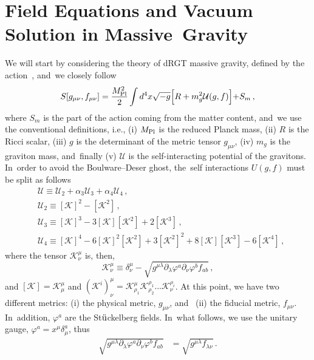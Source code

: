 \documentclass[aps,amsmath,amssymb,twocolumn]{revtex4}
\begin{document}
\section{Field Equations and Vacuum Solution in Massive~Gravity\label{sec2}}


We will start by considering the theory of dRGT massive gravity, defined by the action~\cite{deRham:2010kj,deRham:2010ik}, and~we closely follow~\cite{Panpanich:2018cxo}
%
\begin{equation}
S[g_{\mu\nu}, f_{\mu \nu}] =  \frac{M_{\rm Pl}^2}{2}   \int d^4 x \sqrt{-g} \Bigl[R + m_g^2 \mathcal{U}(g,f) \Bigl] + S_m \,,
\end{equation}
%
where $S_m$ is the part of the action coming from the matter content, and~we  use the conventional definitions, i.e.,
(i) $M_{\rm Pl}$ is the reduced Planck mass, 
(ii) $R$ is the Ricci scalar, 
(iii) $g$ is the determinant of the metric tensor $g_{\mu \nu}$,
(iv) $m_g$ is the graviton mass, and~finally 
(v) $\mathcal{U}$ is the self-interacting potential of the gravitons. 
In~order to avoid the Boulware--Deser ghost, the~self interactions $U(g,f)$ must be split as follows
%
\begin{align*}
&\mathcal{U} \equiv \mathcal{U}_2 + \alpha_3 \mathcal{U}_3 + \alpha_4 \mathcal{U}_4 \,, \\
&\mathcal{U}_2 \equiv  [\mathcal{K}]^2 - [\mathcal{K}^2] \,, \\
&\mathcal{U}_3 \equiv [\mathcal{K}]^3 - 3 [\mathcal{K}][\mathcal{K}^2] + 2 [\mathcal{K}^3] \,, \\
&\mathcal{U}_4 \equiv [\mathcal{K}]^4 - 6 [\mathcal{K}]^2 [\mathcal{K}^2] + 3[\mathcal{K}^2]^2 + 8 [\mathcal{K}][\mathcal{K}^3] - 6 [\mathcal{K}^4] \,,
\end{align*}%
where the tensor $\mathcal{K}^{\mu}_{\nu}$ is, then,
\vspace{12pt}
\begin{equation}
\mathcal{K}^{\mu}_{\nu} \equiv \delta^{\mu}_{\nu} - \sqrt{g^{\mu\lambda} \partial_{\lambda} \varphi^a \partial_{\nu} \varphi^b f_{ab}} \,,
\end{equation}
%
and $[\mathcal{K}] = \mathcal{K}^{\mu}_{\mu}$ and $(\mathcal{K}^i)^{\mu}_{\nu} = \mathcal{K}^{\mu}_{\rho_1} \mathcal{K}^{\rho_1}_{\rho_2} ... \mathcal{K}^{\rho_i}_{\nu}$. 
At this point, we have two different metrics: 
(i)  the  physical metric, $g_{\mu\nu}$, and~
(ii) the fiducial metric, $f_{\mu\nu}$. In~addition, $\varphi^a$ are the St$\Ddot{\rm u}$ckelberg fields. In~what follows, we use the unitary gauge, $\varphi^a = x^{\mu} \delta^a_{\mu}$, thus
%
\begin{align*}
\sqrt{g^{\mu\lambda} \partial_{\lambda} \varphi^a \partial_{\nu} \varphi^b f_{ab}} &= \sqrt{g^{\mu\lambda} f_{\lambda\nu}} \,.
\end{align*}
 
\end{document}
